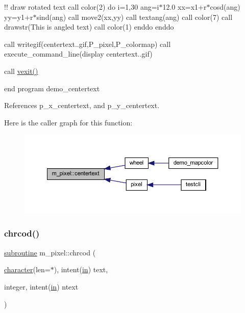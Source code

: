 !! draw rotated text call color(2) do i=1,30 ang=i$\ast$12.0 xx=x1+r$\ast$cosd(ang) yy=y1+r$\ast$sind(ang) call move2(xx,yy) call textang(ang) call color(7) call drawstr(\textquotesingle{}This is angled text\textquotesingle{}) call color(1) enddo enddo

call writegif(\textquotesingle{}centertext..\+gif\textquotesingle{},P\+\_\+pixel,P\+\_\+colormap) call execute\+\_\+command\+\_\+line(\textquotesingle{}display centertext..\+gif\textquotesingle{})

call \hyperlink{namespacem__pixel_a19ad6b65752322b0029a62cc0ebec3e8}{vexit()}

end program demo\+\_\+centertext 

References p\+\_\+x\+\_\+centertext, and p\+\_\+y\+\_\+centertext.

Here is the caller graph for this function\+:
\nopagebreak
\begin{figure}[H]
\begin{center}
\leavevmode
\includegraphics[width=350pt]{namespacem__pixel_a9ddc8e8604bbc3181c728f08a6b87904_icgraph}
\end{center}
\end{figure}
\mbox{\label{namespacem__pixel_ab25c6cce708ff91a79bbabb23d591a8b}} 
\subsubsection{\texorpdfstring{chrcod()}{chrcod()}}
{\footnotesize\ttfamily \hyperlink{M__stopwatch_83_8txt_acfbcff50169d691ff02d4a123ed70482}{subroutine} m\+\_\+pixel\+::chrcod (\begin{DoxyParamCaption}\item[{\hyperlink{option__stopwatch_83_8txt_abd4b21fbbd175834027b5224bfe97e66}{character}(len=$\ast$), intent(\hyperlink{M__journal_83_8txt_afce72651d1eed785a2132bee863b2f38}{in})}]{text,  }\item[{integer, intent(\hyperlink{M__journal_83_8txt_afce72651d1eed785a2132bee863b2f38}{in})}]{ntext }\end{DoxyParamCaption})\hspace{0.3cm}{\ttfamily [private]}}



